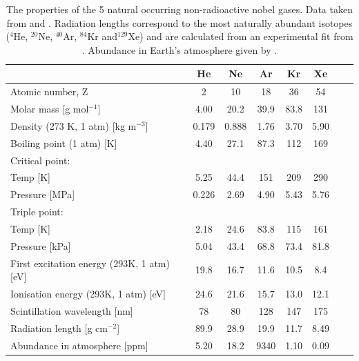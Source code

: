\renewcommand{\arraystretch}{1.5}
\begin{table}
\begin{center}
  \begin{tabular}{l*{6}{c}r}
  \hline
  & \textbf{He} & \textbf{Ne} & \textbf{Ar} & \textbf{Kr} & \textbf{Xe} \\
  \hline
  Atomic number, Z & 2 & 10 & 18 & 36 & 54 \\
  Molar mass [g mol$^{-1}$] & 4.00 & 20.2 & 39.9 & 83.8 & 131 \\
  Density (273 K, 1 atm) [kg m$^{-3}$] & 0.179 & 0.888 & 1.76 & 3.70 & 5.90 \\
  Boiling point (1 atm) [K] & 4.40 & 27.1 & 87.3 & 112 & 169 \\
  Critical point: & & & & & \\
  \hspace{4mm} Temp [K] & 5.25 & 44.4 & 151 & 209 & 290\\
  \hspace{4mm} Pressure [MPa] & 0.226 & 2.69 & 4.90 & 5.43 & 5.76\\
  Triple point: & & & & & \\
  \hspace{4mm} Temp [K] & 2.18 & 24.6 & 83.8 & 115 & 161\\
  \hspace{4mm} Pressure [kPa] & 5.04 & 43.4 & 68.8 & 73.4 & 81.8 \\
  First excitation energy (293K, 1 atm) [eV] &19.8 & 16.7 & 11.6 & 10.5 & 8.4 \\
  Ionisation energy (293K, 1 atm) [eV] & 24.6 & 21.6 & 15.7 & 13.0 & 12.1\\
  Scintillation wavelength [nm] & 78 & 80 & 128 & 147 & 175\\
  Radiation length [g cm$^{-2}$] & 89.9 & 28.9 & 19.9 & 11.7 & 8.49 \\
  Abundance in atmosphere [ppm] & 5.20 &18.2 & 9340 & 1.10 & 0.09 \\
    \hline
  \end{tabular}
      \caption{ The properties of the 5 natural occurring non-radioactive nobel gases. Data taken from \cite{gasDetectors} and \cite{nobleGasDetectors}. Radiation lengths correspond to the most naturally abundant isotopes ($^{4}$He, $^{20}$Ne, $^{40}$Ar, $^{84}$Kr and$^{129}$Xe) and are calculated from an experimental fit from \cite{radiationLengthsBook}. Abundance in Earth's atmosphere given by \cite{nobleGasAbundance}.}
    \label{tab:nobelGasPara1}
\end{center}
    \end{table}
\renewcommand{\arraystretch}{1.0}

